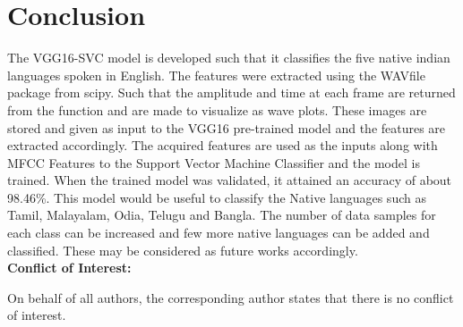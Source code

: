 \documentclass[pdflatex]{sn-jnl}%
\theoremstyle{thmstyleone}%
\theoremstyle{thmstyletwo}%
\theoremstyle{thmstylethree}%
\begin{document}
\section{Conclusion}
The VGG16-SVC model is developed such that it classifies the five native indian languages spoken in English. The features were extracted using the WAVfile package from scipy. Such that the amplitude and time at each frame are returned from the function and are made to visualize as wave plots. These images are stored and given as input to the VGG16 pre-trained model and the features are extracted accordingly. The acquired features are used as the inputs along with MFCC Features to the Support Vector Machine Classifier and the model is trained. When the trained model was validated, it attained an accuracy of about 98.46\%. This model would be useful to classify the Native languages such as Tamil, Malayalam, Odia, Telugu and Bangla. The number of data samples for each class can be increased and few more native languages can be added and classified. These may be considered as future works accordingly. \\

\noindent \textbf{Conflict of Interest:}

On behalf of all authors, the corresponding author states that there is no conflict of interest.
%
\newpage
\end{document}
